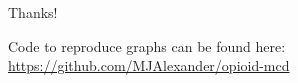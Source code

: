 \documentclass[ignorenonframetext,]{beamer}
\begin{document}
\begin{frame}{Thanks!}

Code to reproduce graphs can be found here:
\url{https://github.com/MJAlexander/opioid-mcd}

\begin{figure}
\captionsetup[subfigure]{labelformat=empty}
\par\vfill \vspace{-0.5cm}
\end{figure}


\end{frame}
\end{document}
